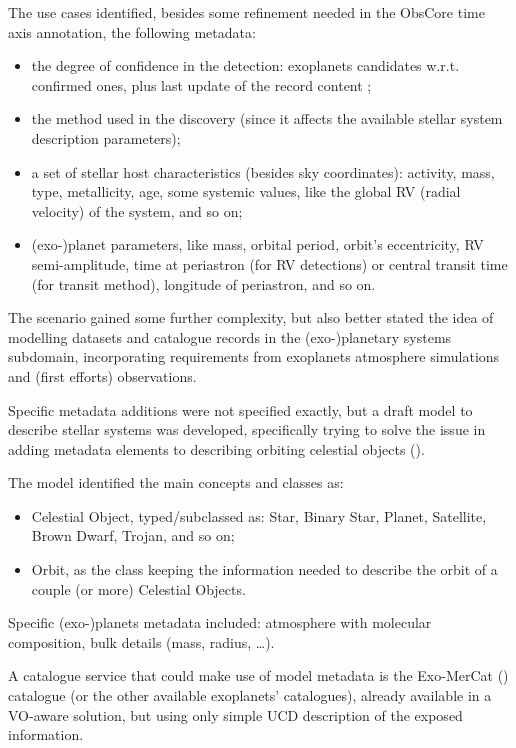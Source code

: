 \documentclass[11pt,a4paper]{ivoa}
\begin{document}
The use cases identified,
besides some refinement needed in the ObsCore time axis annotation, the
following metadata:
\begin{itemize}
	\item the degree of confidence in the detection: exoplanets candidates
w.r.t. confirmed ones, plus last update of the record content ;
	\item the method used in the discovery (since it affects the available
stellar system description parameters);
	\item a set of stellar host characteristics (besides sky coordinates): 
activity, mass, type,
metallicity, age, some systemic values, like the global RV (radial
velocity) of the system, and so on;
	\item (exo-)planet parameters, like mass, orbital period, orbit's
eccentricity, RV semi-amplitude, time at periastron (for RV detections)
or central transit time (for transit method), longitude of periastron,
and so on.
\end{itemize}

The scenario gained some further complexity, but also better stated the
idea of modelling datasets and catalogue records in the (exo-)planetary
systems subdomain, incorporating requirements from exoplanets atmosphere
simulations and (first efforts) observations. 

Specific metadata additions were not specified exactly, but a draft model
to describe stellar systems was developed, specifically trying to solve
the issue in adding metadata elements to describing orbiting celestial
objects (\cite{2019ASPC..523..597M}).

The model identified the main concepts and classes as:
\begin{itemize}
	\item Celestial Object, typed/subclassed as: Star, Binary Star,
Planet, Satellite, Brown Dwarf, Trojan, and so on;
	\item Orbit, as the class keeping the information needed to describe
the orbit of a couple (or more) Celestial Objects.
\end{itemize}

Specific (exo-)planets metadata included: atmosphere with molecular
composition, bulk details (mass, radius, \ldots).

A catalogue service that could make use of model metadata is the
Exo-MerCat (\cite{2020A&C....3100370A}) catalogue (or the other available exoplanets'
catalogues), already available in a VO-aware solution, but using only
simple UCD description of the exposed information.
\end{document}

